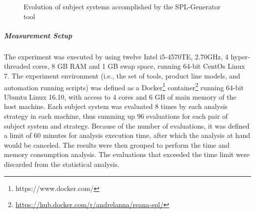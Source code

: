 \begin{figure}
  
  \caption{Evolution of subject systems accomplished by the SPL-Generator tool}
  \label{fig:subjectSystemsEvolutions}
\end{figure}

\subparagraph*{Measurement Setup}

The experiment was executed by using twelve Intel i5-4570TE, 2.70GHz, 4
hyper-threaded cores, 8 GB RAM and 1 GB swap space, running 64-bit CentOs Linux
7.  The experiment environment (i.e., the set of tools, product line models, and
automation running scripts) was defined as a
Docker\footnote{https://www.docker.com/}
container\footnote{\url{https://hub.docker.com/r/andrelanna/reana-spl/}} running
64-bit Ubuntu Linux 16.10, with access to 4 cores and 6 GB of main memory of the
host machine. Each subject system was evaluated 8 times by each analysis
strategy in each machine, thus summing up 96 evaluations for each pair of
subject system and strategy.  Because of the number of evaluations, it was
defined a limit of $60$ minutes for analysis execution time, after which the
analysis at hand would be canceled.  The results were then grouped to perform
the time and memory consumption analysis. The evaluations that exceeded the time
limit were discarded from the statistical analysis. 









